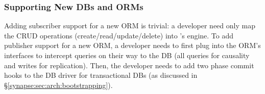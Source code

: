 \setlength{\tabcolsep}{3pt}
\begin{table}[t]
 \vspace{-0.3cm}
 \caption{{\small {\bf Support for Various DBs.}
 Shows ORM- and DB-specific lines of code (LoC) to support varied DBs.
 For ORMs supporting many DBs (e.g., ActiveRecord), adding a new DB comes for free.}}
 \label{synapse:tab:db-heterogeneity}
\end{table}
\setlength{\tabcolsep}{5pt}

\subsubsection{Supporting New DBs and ORMs}
Adding subscriber support for a new ORM is trivial: a developer need only map the CRUD operations (create/read/update/delete) into \synapse's engine.
To add publisher support for a new ORM, a developer needs to first plug into the ORM's interfaces to intercept queries on their way to the DB (all queries for causality and writes for replication).
Then, the developer needs to add two phase commit hooks to the DB driver for transactional DBs (as discussed in \S\ref{synapse:sec:arch:bootstrapping}).

